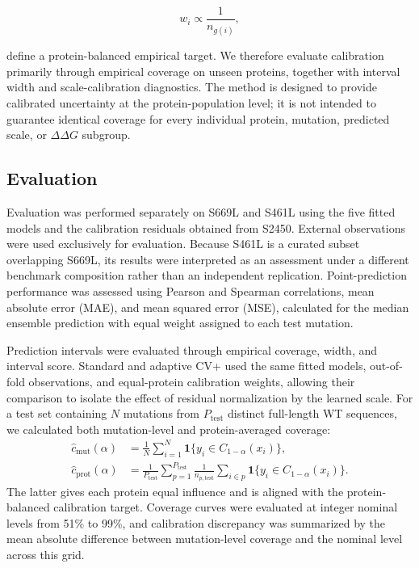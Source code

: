 \documentclass[11pt]{article}
\begin{document}
$$
w_i\propto\frac{1}{n_{g(i)}},
$$

define a protein-balanced empirical target.
We therefore evaluate calibration primarily through empirical coverage on unseen proteins, together with interval width and scale-calibration diagnostics. The method is designed to provide calibrated uncertainty at the protein-population level; it is not intended to guarantee identical coverage for every individual protein, mutation, predicted scale, or \(\Delta\Delta G\) subgroup.


\subsection{Evaluation}


\label{sec:evaluation}

Evaluation was performed separately on S669L and S461L using the five fitted models and the calibration residuals obtained from S2450. External observations were used exclusively for evaluation. Because S461L is a curated subset overlapping S669L, its results were interpreted as an assessment under a different benchmark composition rather than an independent replication. Point-prediction performance was assessed using Pearson and Spearman correlations, mean absolute error (MAE), and mean squared error (MSE), calculated for the median ensemble prediction with equal weight assigned to each test mutation.

Prediction intervals were evaluated through empirical coverage, width, and interval score. Standard and adaptive CV+ used the same fitted models, out-of-fold observations, and equal-protein calibration weights, allowing their comparison to isolate the effect of residual normalization by the learned scale. For a test set containing $N$ mutations from $P_{\mathrm{test}}$ distinct full-length WT sequences, we calculated both mutation-level and protein-averaged coverage:
\begin{align}
\widehat{c}_{\mathrm{mut}}(\alpha)
&=
\frac{1}{N}
\sum_{i=1}^{N}
\mathbf{1}\{y_i \in C_{1-\alpha}(x_i)\},
\\
\widehat{c}_{\mathrm{prot}}(\alpha)
&=
\frac{1}{P_{\mathrm{test}}}
\sum_{p=1}^{P_{\mathrm{test}}}
\frac{1}{n_{p,\mathrm{test}}}
\sum_{i\in p}
\mathbf{1}\{y_i \in C_{1-\alpha}(x_i)\}.
\end{align}
The latter gives each protein equal influence and is aligned with the protein-balanced calibration target. Coverage curves were evaluated at integer nominal levels from 51\% to 99\%, and calibration discrepancy was summarized by the mean absolute difference between mutation-level coverage and the nominal level across this grid.
\end{document}
